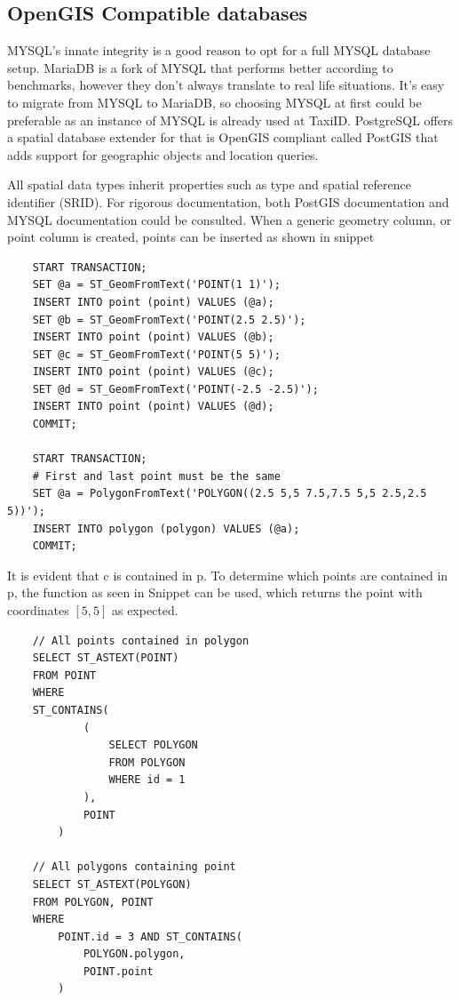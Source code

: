 \subsection{OpenGIS Compatible databases}
MYSQL’s innate integrity is a good reason to opt for a full MYSQL database setup. MariaDB is a fork of MYSQL that performs better according to benchmarks, however they don’t always translate to real life situations. It’s easy to migrate from MYSQL to MariaDB, so choosing MYSQL at first could be preferable as an instance of MYSQL is already used at TaxiID. PostgreSQL offers a spatial database extender for that is OpenGIS compliant called PostGIS that adds support for geographic objects and location queries.

All spatial data types inherit properties such as type and spatial reference identifier (SRID). For rigorous documentation, both PostGIS documentation  and MYSQL documentation  could be consulted. When a generic geometry column, or point column is created, points can be inserted as shown in snippet 

\begin{lstlisting}
	START TRANSACTION;
	SET @a = ST_GeomFromText('POINT(1 1)');
	INSERT INTO point (point) VALUES (@a);
	SET @b = ST_GeomFromText('POINT(2.5 2.5)');
	INSERT INTO point (point) VALUES (@b);
	SET @c = ST_GeomFromText('POINT(5 5)');
	INSERT INTO point (point) VALUES (@c);
	SET @d = ST_GeomFromText('POINT(-2.5 -2.5)');
	INSERT INTO point (point) VALUES (@d);
	COMMIT;

	START TRANSACTION;
	# First and last point must be the same
	SET @a = PolygonFromText('POLYGON((2.5 5,5 7.5,7.5 5,5 2.5,2.5 5))');
	INSERT INTO polygon (polygon) VALUES (@a);
	COMMIT;
\end{lstlisting}


It is evident that c is contained in p. To determine which points are contained in p, the function as seen in Snippet  can be used, which returns the point with coordinates $[5, 5]$ as expected.

\begin{lstlisting}
	// All points contained in polygon
	SELECT ST_ASTEXT(POINT)
	FROM POINT
	WHERE
	ST_CONTAINS(
			(
				SELECT POLYGON
				FROM POLYGON
				WHERE id = 1
			),
			POINT
		)

	// All polygons containing point
	SELECT ST_ASTEXT(POLYGON)
	FROM POLYGON, POINT
	WHERE
		POINT.id = 3 AND ST_CONTAINS(
			POLYGON.polygon,
			POINT.point
		)
\end{lstlisting}

